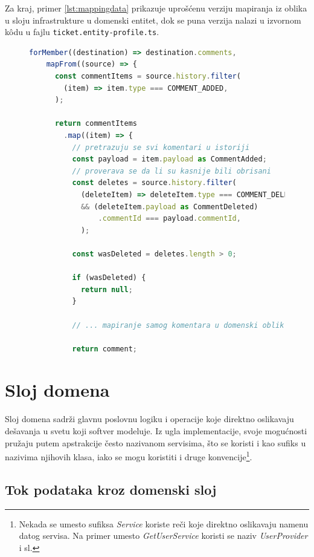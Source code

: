 \documentclass[12pt,oneside]{memoir}
\begin{document}
\newpage
Za kraj, primer \ref{lst:mappingdata} prikazuje uprošćenu verziju mapiranja iz oblika u sloju infrastrukture u domenski entitet, dok se puna verzija nalazi u izvornom k\^{o}du u fajlu \verb|ticket.entity-profile.ts|.

\begin{figure}[h]
\begin{lstlisting}[language=JavaScript, style=ES6, caption={Mapiranje komentara kartice.}, label={lst:mappingdata}]
  forMember((destination) => destination.comments,
    mapFrom((source) => {
      const commentItems = source.history.filter(
        (item) => item.type === COMMENT_ADDED,
      );

      return commentItems
        .map((item) => {
          // pretrazuju se svi komentari u istoriji
          const payload = item.payload as CommentAdded;
          // proverava se da li su kasnije bili obrisani
          const deletes = source.history.filter(
            (deleteItem) => deleteItem.type === COMMENT_DELETED 
            && (deleteItem.payload as CommentDeleted)
                .commentId === payload.commentId,
            );
          
          const wasDeleted = deletes.length > 0;

          if (wasDeleted) {
            return null;
          }

          // ... mapiranje samog komentara u domenski oblik...

          return comment;

\end{lstlisting}
\end{figure}



\newpage
\section{Sloj domena}
\label{sec:layer_domain}

Sloj domena sadrži glavnu poslovnu logiku i operacije koje direktno oslikavaju dešavanja u svetu koji softver modeluje. Iz ugla implementacije, svoje mogućnosti pružaju putem apstrakcije često nazivanom servisima, što se koristi i kao sufiks u nazivima njihovih klasa, iako se mogu koristiti i druge konvencije\footnote{Nekada se umesto sufiksa \textit{Service} koriste reči koje direktno oslikavaju namenu datog servisa. Na primer umesto \textit{GetUserService} koristi se naziv \textit{UserProvider} i sl.}.

\subsection{Tok podataka kroz domenski sloj}
\end{document}
